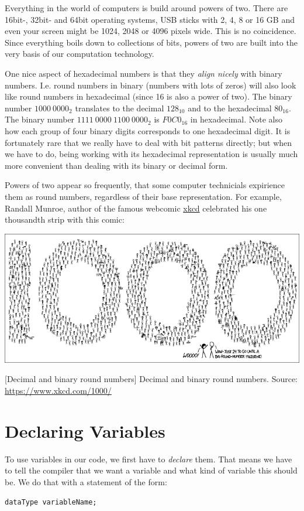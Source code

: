 \begin{plusbox}
Everything in the world of computers is build around powers of two. There are 16bit-, 32bit- and 64bit operating systems, USB sticks with 2, 4, 8 or 16 GB and even your screen might be 1024, 2048 or 4096 pixels wide. This is no coincidence. Since everything boils down to collections of bits, powers of two are built into the very basis of our computation technology.

One nice aspect of hexadecimal numbers is that they \emph{align nicely} with binary numbers. I.\;e. round numbers in binary (numbers with lots of zeros) will also look like round numbers in hexadecimal (since 16 is also a power of two). The binary number $1000~ 0000_2$ translates to the decimal $128_{10}$ and to the hexadecimal $80_{16}$. The binary number $1111~ 0000~ 1100~ 0000_2$ is $F0C0_{16}$ in hexadecimal. Note also how each group of four binary digits corresponds to one hexadecimal digit. It is fortunately rare that we really have to deal with bit patterns directly; but when we have to do, being working with its hexadecimal representation is usually much more convenient than dealing with its binary or decimal form.

Powers of two appear so frequently, that some computer technicials expirience them as round numbers, regardless of their base representation. For example, Randall Munroe, author of the famous webcomic \href{https://www.xkcd.com/}{xkcd} celebrated his one thousandth strip with this comic:
\begin{center}
\includegraphics[width=.9\linewidth]{./gfx/xkcd-1000}
\end{center}
	[Decimal and binary round numbers]
	{Decimal and binary round numbers. Source: \url{https://www.xkcd.com/1000/}}
\end{plusbox}


\section{Declaring Variables} \label{sec:DeclareVars}
To use variables in our code, we first have to \emph{declare} them. That means we have to tell the compiler that we want a variable and what kind of variable this should be. We do that with a statement of the form:
\begin{codebox}
\texttt{dataType variableName;}
\end{codebox}

